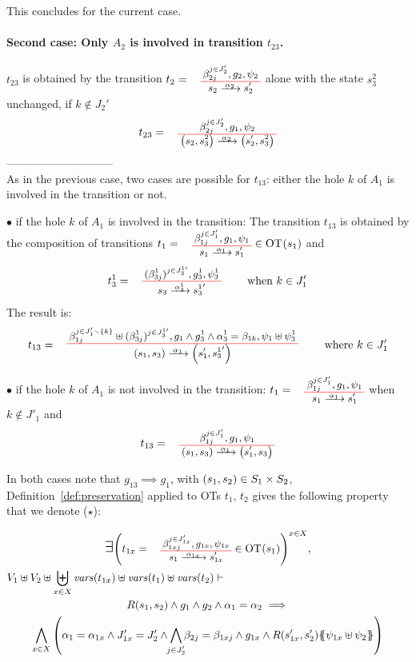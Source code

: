 \documentclass[runningheads]{llncs}
\begin{document}
\begin{enumerate}
This concludes for the current case.

\paragraph{Second case: Only $A_2$ is involved in transition $t_{23}$.}
$t_{23}$ is obtained  by  the transition $t_2=\OTx{2}{}{2}{2}$ alone with the state $s^2_3$ unchanged, if $k \not\in J_2'$
\[t_{23} = \OT{\mpar{s_2, s^2_3}}{\mpar{s'_2, s^2_3}}{\alpha_2}{\beta_{2j}^{j \in J'_2}}{g_1}{\psi_2}
\]
-----------------------------\\
As in the previous case, two cases are possible for $t_{13}$: either the hole $k$ of $A_1$ is involved in the transition or not.

$\bullet$ if  the hole $k$ of $A_1$ is involved in the transition: 
The transition $t_{13}$ is obtained by the composition of  transitions $t_1=\OTx{1}{}{1}{1}\in\fOT{s_1}$ and  \[t_3^1=
\OT{ s_3}{{s^1_3}'}{\alpha_3^1}{   {(\beta^1_{3j})^{j \in J^{1 \prime}_3} }}{ g^1_3 }{ \psi^1_3} \qquad \text{ when } k \in J'_{1} 
\] The result is:
\[
t_{13} = \OT{\mpar{s_1, s_3}}{\mpar{s'_1, {s^1_3}'}}{\alpha_1}{\beta_{1j}^{j \in J'_1 \setminus \{k\}} \uplus  {(\beta^1_{3j})^{j \in J^{1 \prime}_3} }}{g_1 \wedge g^1_3 \wedge \alpha^1_3 = \beta_{1k}}{\psi_1 \uplus \psi^1_3} \qquad \text{ where } k \in J'_{1} 
\]

$\bullet$ if  the hole $k$ of $A_1$ is not involved in the transition:
$t_1=\OTx{1}{}{1}{1}$ when  $k \not\in J'_{1} $
and 
\[
t_{13} = \OT{\mpar{s_1, s_3}}{\mpar{s'_1, {s_3}}}{\alpha_1}{\beta_{1j}^{j \in J'_1}}{g_1}{\psi_1}
\]

In both cases note that $g_{13} \implies g_1$, with  ${\left(s_1, s_2\right)} \in S_1 \times S_2$, Definition~\ref{def:preservation} applied to OTs $t_1,\,t_2$ gives the following property that we denote ($\star$):

\begin{multline*}
\bigexists 
\mpar{t_{1x} = \OTx{1}{x}{1x}{1x} \in \fOT{s_1}}^{x \in X},\\
  V_1 \uplus V_2 \uplus \biguplus_{x\in X}\fvars{t_{1x}} \uplus \fvars{t_1} \uplus \fvars{t_2} \vdash \hspace{6cm}\\  R\mpar{s_1, s_2} \wedge 	g_1 \wedge g_2 \wedge \alpha_1 = \alpha_2 
\implies \\
\bigwedge_{x\in X}
\mpar{
\alpha_1=\alpha_{1 x}  \land J'_{1x}= J'_2 \land \bigwedge_\subbox{j \in J'_2 } \beta_{2j} = \beta_{1xj}\land g_{1 x}\land
 R\mpar{s'_{1 x}, s'_2}\psubst{\psi_{1 x} \uplus \psi_2}}
\end{multline*}


\end{enumerate}
\end{document}

